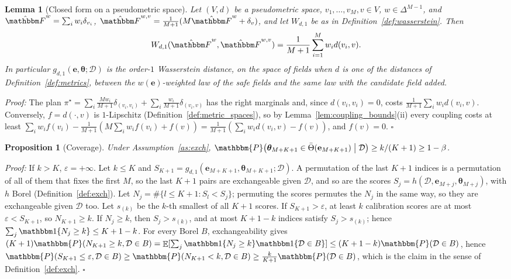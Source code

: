 \documentclass{article}
\DeclareMathOperator{\E}{\mathbb{E}}
\newcommand{\PP}{\mathbbm{P}}
\newcommand{\cD}{\mathcal{D}}
\newcommand{\bth}{\boldsymbol{\theta}}
\newcommand{\be}{\mathbf{e}}
\newcommand{\Tbar}{\bar{\Theta}}
\theoremstyle{plain}
\newtheorem{lemma}[theorem]{Lemma}
\newtheorem{proposition}[theorem]{Proposition}
\theoremstyle{remark}
\begin{document}
\begin{lemma}[Closed form on a pseudometric space]\label{lem:closed_form}
Let $(V,d)$ be a pseudometric space, $v_1,\dots,v_M,v\in V$, $w\in\Delta^{M-1}$, and
$\hat{\mathbbm F}^w=\sum_iw_i\delta_{v_i}$, $\hat{\mathbbm F}^{w,v}=\frac{1}{M+1}(M\hat{\mathbbm F}^w+\delta_v)$, and let $W_{d,1}$ be as in
Definition~\ref{def:wasserstein}. Then
\[
W_{d,1}(\hat{\mathbbm F}^w,\hat{\mathbbm F}^{w,v})=\frac{1}{M+1}\sum_{i=1}^Mw_id(v_i,v).
\]
In particular $g_{d,1}(\be,\bth;\cD)$ is the order-$1$ Wasserstein distance, on the space of fields
when $d$ is one of the distances of Definition~\ref{def:metrics}, between the $w(\be)$-weighted law of
the safe fields and the same law with the candidate field added.
\end{lemma}
\textit{Proof:}
The plan $\pi^\star=\sum_i\frac{Mw_i}{M+1}\delta_{(v_i,v_i)}+\sum_i\frac{w_i}{M+1}\delta_{(v_i,v)}$ has the right marginals
and, since $d(v_i,v_i)=0$, costs $\frac{1}{M+1}\sum_iw_id(v_i,v)$. Conversely, $f=d(\cdot,v)$ is $1$-Lipschitz
(Definition~\ref{def:metric_spaces}), so by Lemma~\ref{lem:coupling_bounds}(ii) every coupling costs at least
$\sum_iw_if(v_i)-\frac{1}{M+1}(M\sum_iw_if(v_i)+f(v))=\frac{1}{M+1}(\sum_iw_id(v_i,v)-f(v))$, and $f(v)=0$. \hfill$\square$

\begin{proposition}[Coverage]\label{pr:coverage}
Under Assumption~\ref{as:exch},
$\PP\big(\bth_{M+K+1}\in\Tbar(\be_{M+K+1})\mathrel{\big|}\cD\big)\ge k/(K+1)\ge1-\beta$.
\end{proposition}
\textit{Proof:}
If $k>K$, $\varepsilon=+\infty$. Let $k\le K$ and $S_{K+1}=g_{d,1}(\be_{M+K+1},\bth_{M+K+1};\cD)$. A permutation of the last $K+1$ indices is a
permutation of all of them that fixes the first $M$, so the last $K+1$ pairs are exchangeable given $\cD$, and so are the scores
$S_j=h(\cD,\be_{M+j},\bth_{M+j})$, with $h$ Borel (Definition~\ref{def:exch}). Let $N_j=\#\{l\le K+1:S_l<S_j\}$; permuting the scores permutes
the $N_j$ in the same way, so they are exchangeable given $\cD$ too. Let $s_{(k)}$ be the $k$-th smallest of all $K+1$ scores. If
$S_{K+1}>\varepsilon$, at least $k$ calibration scores are at most $\varepsilon<S_{K+1}$, so $N_{K+1}\ge k$. If $N_j\ge k$, then $S_j>s_{(k)}$, and at
most $K+1-k$ indices satisfy $S_j>s_{(k)}$; hence $\sum_j\mathbbm 1\{N_j\ge k\}\le K+1-k$. For every Borel $B$, exchangeability gives
$(K+1)\PP(N_{K+1}\ge k,\cD\in B)=\E[\sum_j\mathbbm 1\{N_j\ge k\}\mathbbm 1\{\cD\in B\}]\le(K+1-k)\PP(\cD\in B)$, hence
$\PP(S_{K+1}\le\varepsilon,\cD\in B)\ge\PP(N_{K+1}<k,\cD\in B)\ge\frac{k}{K+1}\PP(\cD\in B)$, which is the claim in the sense of
Definition~\ref{def:exch}. \hfill$\square$
\end{document}
